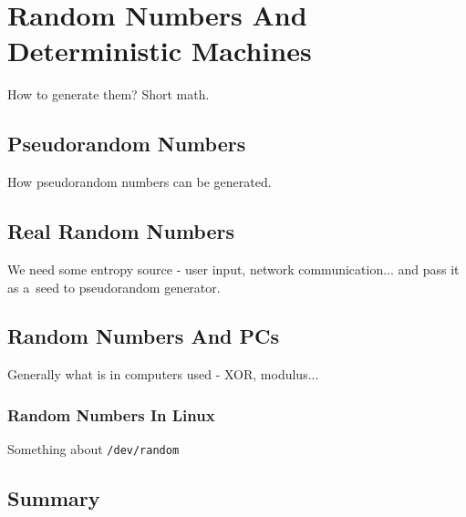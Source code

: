 \chapter{Random Numbers And Deterministic Machines}
How to generate them? Short math.

\section{Pseudorandom Numbers}
How pseudorandom numbers can be generated.

\section{Real Random Numbers}
We need some entropy source - user input, network communication... and pass it as a~seed to pseudorandom generator.


\section{Random Numbers And PCs}
Generally what is in computers used - XOR, modulus...
\subsection{Random Numbers In Linux}
Something about {\tt /dev/random}

\section{Summary}
